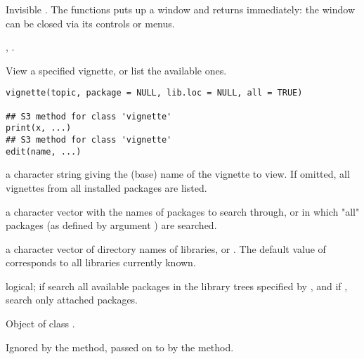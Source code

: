 %
\begin{Value}
Invisible .  The functions puts up a window and returns
immediately: the window can be closed via its controls or menus.
\end{Value}
%
\begin{SeeAlso}\relax
{},
.
\end{SeeAlso}
%
\begin{Description}\relax
View a specified vignette, or list the available ones.
\end{Description}
%
\begin{Usage}
\begin{verbatim}
vignette(topic, package = NULL, lib.loc = NULL, all = TRUE)

## S3 method for class 'vignette'
print(x, ...)
## S3 method for class 'vignette'
edit(name, ...)
\end{verbatim}
\end{Usage}
%
\begin{Arguments}
\begin{ldescription}
\item[\code{topic}] a character string giving the (base) name of the vignette
to view. If omitted, all vignettes from all installed packages are listed.
\item[\code{package}] a character vector with the names of packages to
search through, or  in which "all" packages (as defined
by argument ) are searched.
\item[\code{lib.loc}] a character vector of directory names of \R{} libraries,
or .  The default value of  corresponds to all
libraries currently known.
\item[\code{all}] logical; if  search
all available packages in the library trees specified by , 
and if , search only attached packages.
\item[\code{x, name}] Object of class .
\item[\code{...}] Ignored by the  method, passed on to
 by the  method.
\end{ldescription}
\end{Arguments}
